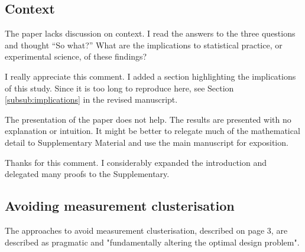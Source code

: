 

\subsection{Context}
\RC The paper lacks discussion on context. I read the answers to the
three questions and thought “So what?”  What are the implications to
statistical practice, or experimental science, of these findings?

\AR I really appreciate this comment. I added a section highlighting
the implications of this study. Since it is too long to reproduce
here, see Section \ref{subsub:implications} in the revised manuscript.


\RC The presentation of the paper does not help. The results are
presented with no explanation or intuition. It might be better to
relegate much of the mathematical detail to Supplementary Material and
use the main manuscript for exposition.

\AR Thanks for this comment. I considerably expanded the
  introduction and delegated many proofs to the Supplementary.


\subsection{Avoiding measurement clusterisation}
\RC The approaches to avoid measurement clusterisation, described on page
3, are described as pragmatic and "fundamentally altering the optimal
design problem".

